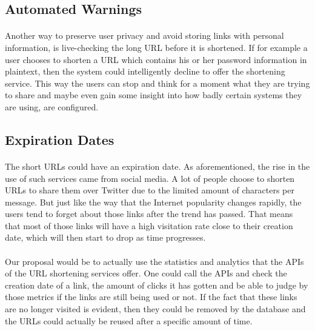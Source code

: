 \documentclass[12pt]{article}
\begin{document}
\subsection{Automated Warnings}

\paragraph{}
Another way to preserve user privacy and avoid storing links with personal information, is live-checking the long URL before it is shortened. If for example a user chooses to shorten a URL which contains his or her password information in plaintext, then the system could intelligently decline to offer the shortening service. This way the users can stop and think for a moment what they are trying to share and maybe even gain some insight into how badly certain systems they are using, are configured.

\subsection{Expiration Dates}

\paragraph{}
The short URLs could have an expiration date. As aforementioned, the rise in the use of such services came from social media. A lot of people choose to shorten URLs to share them over Twitter due to the limited amount of characters per message. But just like the way that the Internet popularity changes rapidly, the users tend to forget about those links after the trend has passed. That means that most of those links will have a high visitation rate close to their creation date, which will then start to drop as time progresses.

\paragraph{}
Our proposal would be to actually use the statistics and analytics that the APIs of the URL shortening services offer. One could call the APIs and check the creation date of a link, the amount of clicks it has gotten and be able to judge by those metrics if the links are still being used or not. If the fact that these links are no longer visited is evident, then they could be removed by the database and the URLs could actually be reused after a specific amount of time.
\end{document}
